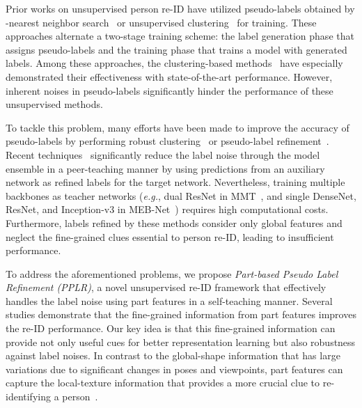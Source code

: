 \documentclass[10pt,twocolumn,letterpaper]{article}
\begin{document}
    Prior works on unsupervised person re-ID have utilized pseudo-labels obtained by -nearest neighbor search~\cite{lin2020unsupervised, wang2020unsupervised, yu2019unsupervised} or unsupervised clustering~\cite{lin2019aBottom, fu2019self} for training.
    These approaches alternate a two-stage training scheme: the label generation phase that assigns pseudo-labels and the training phase that trains a model with generated labels.
    Among these approaches, the clustering-based methods~\cite{chen2021ice, ge2020selfpaced} have especially demonstrated their effectiveness with state-of-the-art performance.
    However, inherent noises in pseudo-labels significantly hinder the performance of these unsupervised methods.

    To tackle this problem, many efforts have been made to improve the accuracy of pseudo-labels by performing robust clustering~\cite{ge2020selfpaced, zhai2020ad} or pseudo-label refinement~\cite{lin2020unsupervised, zhang2021refining}.
    Recent techniques~\cite{ge2020mutual, zhai2020multiple} significantly reduce the label noise through the model ensemble in a peer-teaching manner by using predictions from an auxiliary network as refined labels for the target network.
    Nevertheless, training multiple backbones as teacher networks (\textit{e.g.}, dual ResNet in MMT~\cite{ge2020mutual}, and single DenseNet, ResNet, and Inception-v3 in MEB-Net~\cite{zhai2020multiple}) requires high computational costs.
    Furthermore, labels refined by these methods consider only global features and neglect the fine-grained clues essential to person re-ID, leading to insufficient performance.

    To address the aforementioned problems, we propose \textit{Part-based Pseudo Label Refinement (PPLR)}, a novel unsupervised re-ID framework that effectively handles the label noise using part features in a self-teaching manner.
    Several studies \cite{sun2018beyond, zheng2019pyramidal} demonstrate that the fine-grained information from part features improves the re-ID performance.
    Our key idea is that this fine-grained information can provide not only useful cues for better representation learning but also robustness against label noises.
    In contrast to the global-shape information that has large variations due to significant changes in poses and viewpoints, part features can capture the local-texture information that provides a more crucial clue to re-identifying a person~\cite{zheng2019joint}.
\end{document}
